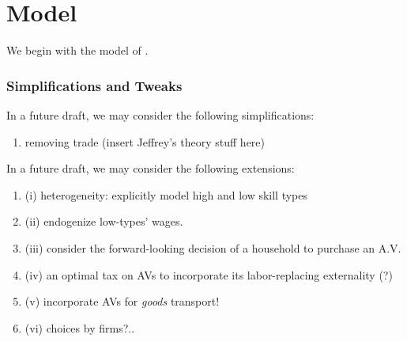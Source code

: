 \documentclass{article}
\begin{document}




\section{Model}

We begin with the model of \citep{monte_commuting_2018}.




\subsubsection{Simplifications and Tweaks}

In a future draft, we may consider the following simplifications: 

\begin{enumerate}
\item removing trade (insert Jeffrey's theory stuff here)
\end{enumerate}

In a future draft, we may consider the following extensions: 
\begin{enumerate}
\item  (i) heterogeneity: explicitly model high and low skill types
 \item (ii) endogenize low-types' wages.
\item (iii) consider the forward-looking decision of a household to purchase an A.V.
\item (iv) an optimal tax on AVs to incorporate its labor-replacing externality (?)
\item (v) incorporate AVs for \textit{goods} transport!
\item (vi) choices by firms?..
\end{enumerate}
\end{document}
